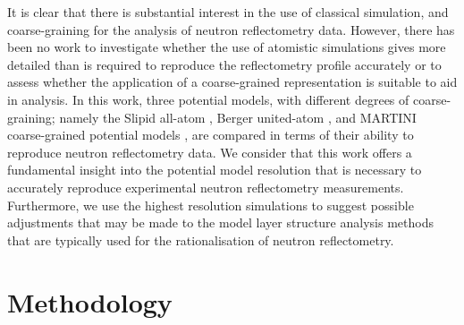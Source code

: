 \documentclass[amsmath,amssymb,twocolumn,superscriptaddress]{revtex4-1}
\begin{document}
It is clear that there is substantial interest in the use of classical simulation, and coarse-graining for the analysis of neutron reflectometry data.
However, there has been no work to investigate whether the use of atomistic simulations gives more detailed than is required to reproduce the reflectometry profile accurately or to assess whether the application of a coarse-grained representation is suitable to aid in analysis.
In this work, three potential models, with different degrees of coarse-graining; namely the Slipid all-atom \cite{jambeck_derivation_2012}, Berger united-atom \cite{berger_molecular_1997}, and MARTINI coarse-grained potential models \cite{marrink_martini_2007}, are compared in terms of their ability to reproduce neutron reflectometry data.
We consider that this work offers a fundamental insight into the potential model resolution that is necessary to accurately reproduce experimental neutron reflectometry measurements.
Furthermore, we use the highest resolution simulations to suggest possible adjustments that may be made to the model layer structure analysis methods that are typically used for the rationalisation of neutron reflectometry.

\section{Methodology}
\end{document}
